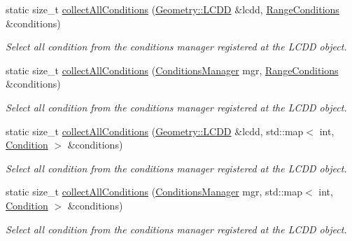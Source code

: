 \begin{DoxyCompactItemize}
\item 
static size\+\_\+t \hyperlink{class_d_d4hep_1_1_conditions_1_1_operators_a62f98243fbe0647f19444b0ad228dd12}{collect\+All\+Conditions} (\hyperlink{class_d_d4hep_1_1_geometry_1_1_l_c_d_d}{Geometry\+::\+L\+C\+DD} \&lcdd, \hyperlink{namespace_d_d4hep_1_1_conditions_ae765f0140a33973a430280f02b6062f4}{Range\+Conditions} \&conditions)
\begin{DoxyCompactList}\small\item\em Select all condition from the conditions manager registered at the L\+C\+DD object. \end{DoxyCompactList}\item 
static size\+\_\+t \hyperlink{class_d_d4hep_1_1_conditions_1_1_operators_a1561bd3845f72fcd583a7bfdc746649c}{collect\+All\+Conditions} (\hyperlink{class_d_d4hep_1_1_conditions_1_1_conditions_manager}{Conditions\+Manager} mgr, \hyperlink{namespace_d_d4hep_1_1_conditions_ae765f0140a33973a430280f02b6062f4}{Range\+Conditions} \&conditions)
\begin{DoxyCompactList}\small\item\em Select all condition from the conditions manager registered at the L\+C\+DD object. \end{DoxyCompactList}\item 
static size\+\_\+t \hyperlink{class_d_d4hep_1_1_conditions_1_1_operators_aab045322f5d5ab9c1134347704d00fad}{collect\+All\+Conditions} (\hyperlink{class_d_d4hep_1_1_geometry_1_1_l_c_d_d}{Geometry\+::\+L\+C\+DD} \&lcdd, std\+::map$<$ int, \hyperlink{class_d_d4hep_1_1_conditions_1_1_condition}{Condition} $>$ \&conditions)
\begin{DoxyCompactList}\small\item\em Select all condition from the conditions manager registered at the L\+C\+DD object. \end{DoxyCompactList}\item 
static size\+\_\+t \hyperlink{class_d_d4hep_1_1_conditions_1_1_operators_a3e62b95a664418388b057e80d20f48b1}{collect\+All\+Conditions} (\hyperlink{class_d_d4hep_1_1_conditions_1_1_conditions_manager}{Conditions\+Manager} mgr, std\+::map$<$ int, \hyperlink{class_d_d4hep_1_1_conditions_1_1_condition}{Condition} $>$ \&conditions)
\begin{DoxyCompactList}\small\item\em Select all condition from the conditions manager registered at the L\+C\+DD object. \end{DoxyCompactList}\end{DoxyCompactItemize}


